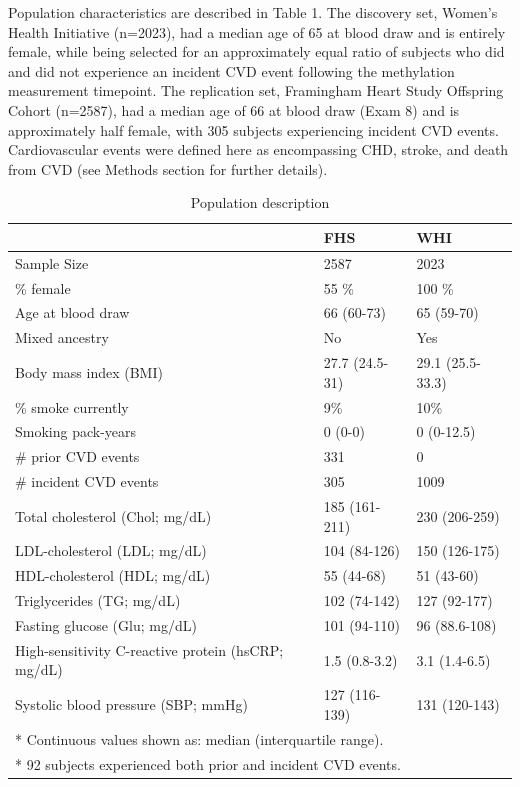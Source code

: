 \documentclass[]{bmcart}
\begin{document}
Population characteristics are described in Table 1. The discovery set,
Women's Health Initiative (n=2023), had a median age of 65 at blood draw
and is entirely female, while being selected for an approximately equal
ratio of subjects who did and did not experience an incident CVD event
following the methylation measurement timepoint. The replication set,
Framingham Heart Study Offspring Cohort (n=2587), had a median age of 66
at blood draw (Exam 8) and is approximately half female, with 305
subjects experiencing incident CVD events. Cardiovascular events were
defined here as encompassing CHD, stroke, and death from CVD (see
Methods section for further details).

\begin{table}[t]

\caption{\label{tab:population-description}Population description}
\centering
\begin{tabular}{lll}
\toprule
  & FHS & WHI\\
\midrule
Sample Size & 2587 & 2023\\
\% female & 55 \% & 100 \%\\
Age at blood draw & 66 (60-73) & 65 (59-70)\\
Mixed ancestry & No & Yes\\
Body mass index (BMI) & 27.7 (24.5-31) & 29.1 (25.5-33.3)\\
\addlinespace
\% smoke currently & 9\% & 10\%\\
Smoking pack-years & 0 (0-0) & 0 (0-12.5)\\
\# prior CVD events & 331 & 0\\
\# incident CVD events & 305 & 1009\\
Total cholesterol (Chol; mg/dL) & 185 (161-211) & 230 (206-259)\\
\addlinespace
LDL-cholesterol (LDL; mg/dL) & 104 (84-126) & 150 (126-175)\\
HDL-cholesterol (HDL; mg/dL) & 55 (44-68) & 51 (43-60)\\
Triglycerides (TG; mg/dL) & 102 (74-142) & 127 (92-177)\\
Fasting glucose (Glu; mg/dL) & 101 (94-110) & 96 (88.6-108)\\
High-sensitivity C-reactive protein (hsCRP; mg/dL) & 1.5 (0.8-3.2) & 3.1 (1.4-6.5)\\
\addlinespace
Systolic blood pressure (SBP; mmHg) & 127 (116-139) & 131 (120-143)\\
\bottomrule
\multicolumn{3}{l}{* Continuous values shown as: median (interquartile range).}\\
\multicolumn{3}{l}{* 92 subjects experienced both prior and incident CVD events.}\\
\end{tabular}
\end{table}
\end{document}
